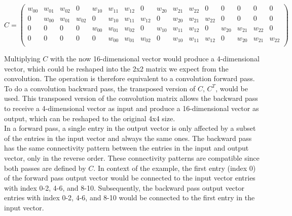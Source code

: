 \[
    C = 
    \left(
    \begin{smallmatrix}
    \textit{$w_{00}$} & \textit{$w_{01}$} & \textit{$w_{02}$} & 0 & 
    \textit{$w_{10}$} & \textit{$w_{11}$} & \textit{$w_{12}$} & 0 & 
    \textit{$w_{20}$} & \textit{$w_{21}$} & \textit{$w_{22}$} & 0 & 
    0 & 0 & 0 & 0\\
    0 & \textit{$w_{00}$} & \textit{$w_{01}$} & \textit{$w_{02}$} & 
    0 & \textit{$w_{10}$} & \textit{$w_{11}$} & \textit{$w_{12}$} & 
    0 & \textit{$w_{20}$} & \textit{$w_{21}$} & \textit{$w_{22}$} & 
    0 & 0 & 0 & 0\\
    0 & 0 & 0 & 0 & 
    \textit{$w_{00}$} & \textit{$w_{01}$} & \textit{$w_{02}$} & 0 & 
    \textit{$w_{10}$} & \textit{$w_{11}$} & \textit{$w_{12}$} & 0 & 
    \textit{$w_{20}$} & \textit{$w_{21}$} & \textit{$w_{22}$} & 0\\
    0 & 0 & 0 & 0 & 
    0 & \textit{$w_{00}$} & \textit{$w_{01}$} & \textit{$w_{02}$} & 
    0 & \textit{$w_{10}$} & \textit{$w_{11}$} & \textit{$w_{12}$} & 
    0 & \textit{$w_{20}$} & \textit{$w_{21}$} & \textit{$w_{22}$}\\
    \end{smallmatrix}
    \right)
\]

\noindent Multiplying $C$ with the now 16-dimensional vector would produce a 4-dimensional vector, which could be reshaped into the 2x2 matrix we expect from the convolution. The operation is therefore equivalent to a convolution forward pass. To do a convolution backward pass, the transposed version of $C$, $C^T$, would be used. This transposed version of the convolution matrix allows the backward pass to receive a 4-dimensional vector as input and produce a 16-dimensional vector as output, which can be reshaped to the original 4x4 size. \\

\noindent In a forward pass, a single entry in the output vector is only affected by a subset of the entries in the input vector and always the same ones. The backward pass has the same connectivity pattern between the entries in the input and output vector, only in the reverse order. These connectivity patterns are compatible since both passes are defined by $C$. In context of the example, the first entry (index 0) of the forward pass output vector would be connected to the input vector entries with index 0-2, 4-6, and 8-10. Subsequently, the backward pass output vector entries with index 0-2, 4-6, and 8-10 would be connected to the first entry in the input vector.\\

